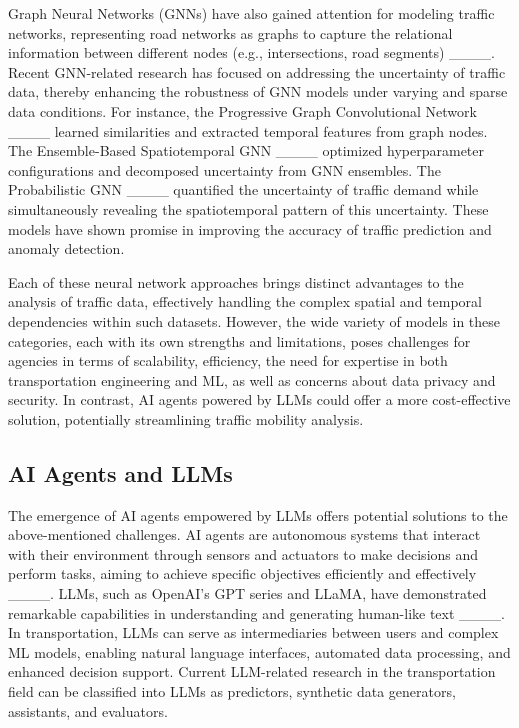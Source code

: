 Graph Neural Networks (GNNs) have also gained attention for modeling traffic networks, representing road networks as graphs to capture the relational information between different nodes (e.g., intersections, road segments) ____. Recent GNN-related research has focused on addressing the uncertainty of traffic data, thereby enhancing the robustness of GNN models under varying and sparse data conditions. For instance, the Progressive Graph Convolutional Network ____ learned similarities and extracted temporal features from graph nodes. The Ensemble-Based Spatiotemporal GNN ____ optimized hyperparameter configurations and decomposed uncertainty from GNN ensembles. The Probabilistic GNN ____ quantified the uncertainty of traffic demand while simultaneously revealing the spatiotemporal pattern of this uncertainty. These models have shown promise in improving the accuracy of traffic prediction and anomaly detection.

Each of these neural network approaches brings distinct advantages to the analysis of traffic data, effectively handling the complex spatial and temporal dependencies within such datasets. However, the wide variety of models in these categories, each with its own strengths and limitations, poses challenges for agencies in terms of scalability, efficiency, the need for expertise in both transportation engineering and ML, as well as concerns about data privacy and security. In contrast, AI agents powered by LLMs could offer a more cost-effective solution, potentially streamlining traffic mobility analysis.

\subsection{AI Agents and LLMs}

The emergence of AI agents empowered by LLMs offers potential solutions to the above-mentioned challenges. AI agents are autonomous systems that interact with their environment through sensors and actuators to make decisions and perform tasks, aiming to achieve specific objectives efficiently and effectively ____. LLMs, such as OpenAI's GPT series and LLaMA, have demonstrated remarkable capabilities in understanding and generating human-like text ____. In transportation, LLMs can serve as intermediaries between users and complex ML models, enabling natural language interfaces, automated data processing, and enhanced decision support. Current LLM-related research in the transportation field can be classified into LLMs as predictors, synthetic data generators, assistants, and evaluators.

